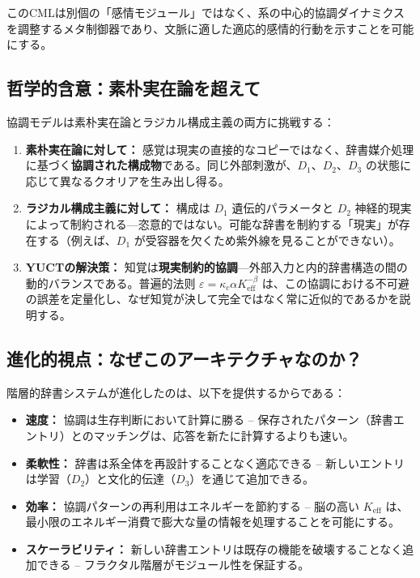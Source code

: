\documentclass[12pt,a4paper]{article}
\newcommand{\eff}{\mathrm{eff}}
\newcommand{\Ke}{K_{\eff}}
\begin{document}
	このCMLは別個の「感情モジュール」ではなく、系の中心的協調ダイナミクスを調整するメタ制御器であり、文脈に適した適応的感情的行動を示すことを可能にする。
	
	\subsection{哲学的含意：素朴実在論を超えて}
	
	協調モデルは素朴実在論とラジカル構成主義の両方に挑戦する：
	
	\begin{enumerate}
		\item \textbf{素朴実在論に対して：} 感覚は現実の直接的なコピーではなく、辞書媒介処理に基づく\textbf{協調された構成物}である。同じ外部刺激が、\(D_1\)、\(D_2\)、\(D_3\) の状態に応じて異なるクオリアを生み出し得る。
		
		\item \textbf{ラジカル構成主義に対して：} 構成は \(D_1\) 遺伝的パラメータと \(D_2\) 神経的現実によって制約される—恣意的ではない。可能な辞書を制約する「現実」が存在する（例えば、\(D_1\) が受容器を欠くため紫外線を見ることができない）。
		
		\item \textbf{YUCTの解決策：} 知覚は\textbf{現実制約的協調}—外部入力と内的辞書構造の間の動的バランスである。普遍的法则 \(\varepsilon = \kappa_c \alpha \Ke^{-\beta}\) は、この協調における不可避の誤差を定量化し、なぜ知覚が決して完全ではなく常に近似的であるかを説明する。
	\end{enumerate}
	
	\subsection{進化的視点：なぜこのアーキテクチャなのか？}
	
	階層的辞書システムが進化したのは、以下を提供するからである：
	
	\begin{itemize}
		\item \textbf{速度：} 協調は生存判断において計算に勝る – 保存されたパターン（辞書エントリ）とのマッチングは、応答を新たに計算するよりも速い。
		\item \textbf{柔軟性：} 辞書は系全体を再設計することなく適応できる – 新しいエントリは学習（\(D_2\)）と文化的伝達（\(D_3\)）を通じて追加できる。
		\item \textbf{効率：} 協調パターンの再利用はエネルギーを節約する – 脳の高い \(\Ke\) は、最小限のエネルギー消費で膨大な量の情報を処理することを可能にする。
		\item \textbf{スケーラビリティ：} 新しい辞書エントリは既存の機能を破壊することなく追加できる – フラクタル階層がモジュール性を保証する。
	\end{itemize}
	
\end{document}
